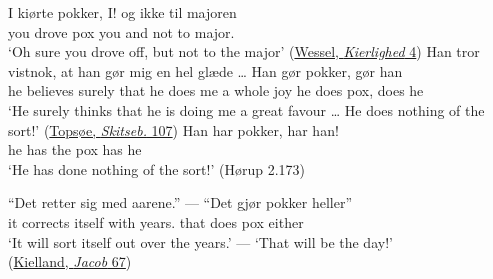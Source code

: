\ea \label{ex:04-229}
\ea{}
\gll I kiørte pokker, I! og ikke til majoren\\
you drove pox you and not to major.\DEF{}\\
\glt `Oh sure you drove off, but not to the major'
\hfill(\href{https://books.google.com/books?id=9_-Z9j0M3z8C&pg=PA4&dq=\%22ki%C3%B8rte+pokker%22+wessel&hl=en&newbks=1&newbks_redir=0&sa=X&ved=2ahUKEwj1-5_B282EAxXZia8BHSJYCUMQ6AF6BAgLEAI#v=onepage&q=\%22ki%C3%B8rte%20pokker%22%20wessel&f=false}{Wessel, \textit{Kierlighed} 4}) %
\ex
\gll Han tror vistnok, at han gør mig en hel glæde {\dots} Han gør pokker, gør han\\
 he believes surely that he does me a whole joy {} he does pox, does he\\
\glt `He surely thinks that he is doing me a great favour {\dots} He does nothing of the sort!'
\hfill(\href{https://tekster.kb.dk/text/adl-texts-topsoe01-root}{Topsøe, \textit{Skitseb.} 107}) %
\ex
\gll Han har pokker, har han!\\
 he has {the pox} has he\\
\glt `He has done nothing of the sort!'
\hfill(Hørup 2.173) %
\z
\z
\largerpage

\ea \label{ex:04-232}
\gll ``Det retter sig med aarene.'' {---} ``Det gjør pokker heller''\\
 it corrects itself with {years.\DEF} {} that does pox either\\
\glt `It will sort itself out over the years.' --- `That will be the day!'\\
\hfill(\href{https://archive.org/details/alexanderlangek00kielgoog/page/n269/mode/2up?q=\%22Det+gjor+Pokker+heller%21\%22&view=theater}{Kielland, \textit{Jacob} 67})
\z
{}

